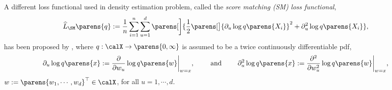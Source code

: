 \documentclass[12pt]{article}
\theoremstyle{definition}
\theoremstyle{theorem}
\theoremstyle{remark}
\begin{document}
A different loss functional used in density estimation problem, called the \textit{score matching (SM) loss functional}, 
\begin{align}\label{eq-sm-loss}
	\widehat{L}_{\SM} \parens{q} := \frac{1}{n} \sum_{i=1}^n \sum_{u=1}^d \parens[\bigg]{\frac{1}{2} \parens[\big]{\partial_u \log q \parens{X_i}}^2 + \partial_u^2 \log q \parens{X_i}}, 
\end{align}
has been proposed by \textcite{Hyvarinen2005-wp}, where $q: \calX \to \parens{0, \infty}$ is assumed to be a twice continuously differentiable pdf, 
\begin{align*}
	\partial_u \log q \parens{x} := \frac{\partial}{\partial w_u} \log q \parens{w} \bigg\vert_{w = x}, \qquad \text{ and } \qquad \partial_u^2 \log q \parens{x} := \frac{\partial^2}{\partial w_u^2} \log q \parens{w} \bigg\vert_{w = x}, 
\end{align*}
$w := \parens{w_1, \cdots, w_d}^\top \in \calX$, for all $u = 1, \cdots, d$. 
\end{document}
